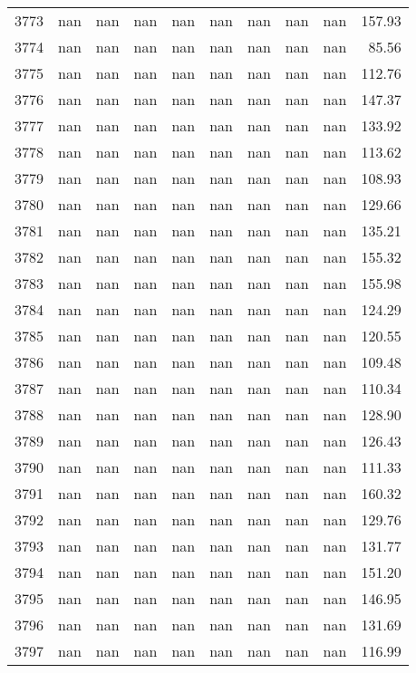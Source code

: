\begin{tabular}{lrrrrrrrrr}
3773 & nan & nan & nan & nan & nan & nan & nan & nan & 157.93 \\
3774 & nan & nan & nan & nan & nan & nan & nan & nan & 85.56 \\
3775 & nan & nan & nan & nan & nan & nan & nan & nan & 112.76 \\
3776 & nan & nan & nan & nan & nan & nan & nan & nan & 147.37 \\
3777 & nan & nan & nan & nan & nan & nan & nan & nan & 133.92 \\
3778 & nan & nan & nan & nan & nan & nan & nan & nan & 113.62 \\
3779 & nan & nan & nan & nan & nan & nan & nan & nan & 108.93 \\
3780 & nan & nan & nan & nan & nan & nan & nan & nan & 129.66 \\
3781 & nan & nan & nan & nan & nan & nan & nan & nan & 135.21 \\
3782 & nan & nan & nan & nan & nan & nan & nan & nan & 155.32 \\
3783 & nan & nan & nan & nan & nan & nan & nan & nan & 155.98 \\
3784 & nan & nan & nan & nan & nan & nan & nan & nan & 124.29 \\
3785 & nan & nan & nan & nan & nan & nan & nan & nan & 120.55 \\
3786 & nan & nan & nan & nan & nan & nan & nan & nan & 109.48 \\
3787 & nan & nan & nan & nan & nan & nan & nan & nan & 110.34 \\
3788 & nan & nan & nan & nan & nan & nan & nan & nan & 128.90 \\
3789 & nan & nan & nan & nan & nan & nan & nan & nan & 126.43 \\
3790 & nan & nan & nan & nan & nan & nan & nan & nan & 111.33 \\
3791 & nan & nan & nan & nan & nan & nan & nan & nan & 160.32 \\
3792 & nan & nan & nan & nan & nan & nan & nan & nan & 129.76 \\
3793 & nan & nan & nan & nan & nan & nan & nan & nan & 131.77 \\
3794 & nan & nan & nan & nan & nan & nan & nan & nan & 151.20 \\
3795 & nan & nan & nan & nan & nan & nan & nan & nan & 146.95 \\
3796 & nan & nan & nan & nan & nan & nan & nan & nan & 131.69 \\
3797 & nan & nan & nan & nan & nan & nan & nan & nan & 116.99 \\

\end{tabular}
